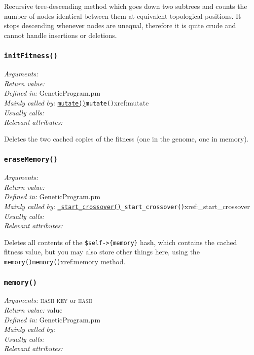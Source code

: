 \documentclass[a4paper]{article}
\begin{document}
Recursive tree-descending method which goes down two subtrees and
counts the number of nodes identical between them at equivalent
topological positions.  It stops descending whenever nodes are unequal,
therefore it is quite crude and cannot handle insertions or deletions.

\subsubsection{\texttt{initFitness()}}\label{xref:initFitness}
\begin{flushleft}
\textit{Arguments:} \\
\textit{Return value:} \\
\textit{Defined in:} GeneticProgram.pm\\
\textit{Mainly called by:} \hyperref[no]{\texttt{mutate()}}{\texttt{mutate()}}{xref:mutate}\\
\textit{Usually calls:} \\
\textit{Relevant attributes:}
\end{flushleft}

Deletes the two cached copies of the fitness (one in the genome, one
in memory).

\subsubsection{\texttt{eraseMemory()}}\label{xref:eraseMemory}
\begin{flushleft}
\textit{Arguments:} \\
\textit{Return value:} \\
\textit{Defined in:} GeneticProgram.pm\\
\textit{Mainly called by:} \hyperref[no]{\texttt{\_start\_crossover()}}{\texttt{\_start\_crossover()}}{xref:_start_crossover}\\
\textit{Usually calls:} \\
\textit{Relevant attributes:}
\end{flushleft}

Deletes all contents of the \verb:$self->{memory}: %
hash, which contains the cached fitness value, but you
may also store other things here, using the \hyperref[no]{\texttt{memory()}}{\texttt{memory()}}{xref:memory}
method.

\subsubsection{\texttt{memory()}}\label{xref:memory}
\begin{flushleft}
\textit{Arguments:} \textsc{hash-key} or \textsc{hash}\\
\textit{Return value:} value\\
\textit{Defined in:} GeneticProgram.pm\\
\textit{Mainly called by:} \\
\textit{Usually calls:} \\
\textit{Relevant attributes:}
\end{flushleft}
\end{document}
